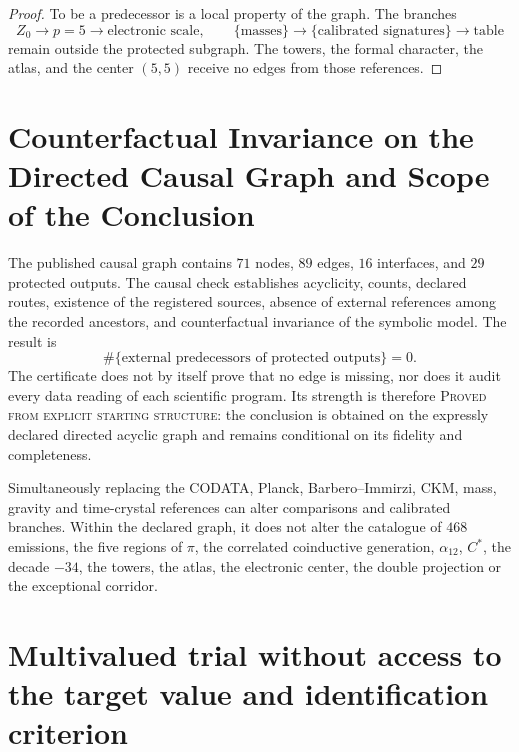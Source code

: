 \begin{proof}
To be a predecessor is a local property of the graph. The branches
\[
 Z_0\longrightarrow p=5\longrightarrow\text{electronic scale},
\qquad
 \{\text{masses}\}\longrightarrow\{\text{calibrated signatures}\}
 \longrightarrow\text{table}
\]
remain outside the protected subgraph. The towers, the formal character, the
atlas, and the center \((5,5)\) receive no edges from those references.
\end{proof}

\section{Counterfactual Invariance on the Directed Causal Graph and Scope of the Conclusion}
\label{sec:certificado-independencia-prospectiva}

The published causal graph contains \(71\) nodes, \(89\) edges,
\(16\) interfaces, and
\(29\) protected outputs. The causal check establishes acyclicity, counts,
declared routes, existence of the registered sources, absence of
external references among the recorded ancestors, and counterfactual
invariance of the symbolic model. The result is
\[
 \#\{\text{external predecessors of protected outputs}\}=0.
\]
The certificate does not by itself prove that no edge is missing, nor does it audit every data reading of each scientific program. Its strength is therefore \textsc{Proved from explicit starting structure}: the conclusion is obtained on the expressly declared directed acyclic graph and remains conditional on its fidelity and completeness.

Simultaneously replacing the CODATA, Planck,
Barbero--Immirzi, CKM, mass, gravity and time-crystal references can alter
comparisons and calibrated branches. Within the declared graph, it does not alter
the catalogue of \(468\) emissions, the five regions of \(\pi\), the
correlated coinductive generation, \(\alpha_{12}\), \(C^\ast\), the decade \(-34\), the towers,
the atlas, the electronic center, the double projection or the exceptional
corridor.

\section{Multivalued trial without access to the target value and identification criterion}
\label{sec:protocolo-ciego-multivaluado}

